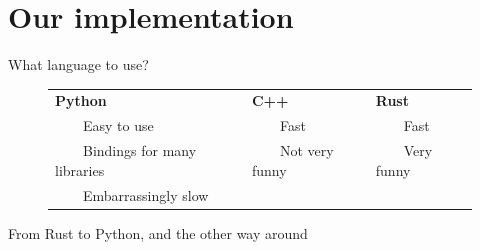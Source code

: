 \documentclass[aspectratio=169]{beamer}
\newcommand{\tabitem}{~~\llap{\textbullet}~~}
\theoremstyle{definition}
\begin{document}
\section{Our implementation}
\begin{frame}{What language to use?}
    \begin{figure}
        \centering
        \renewcommand{\arraystretch}{1.4}
        \begin{tabular}{p{5cm}p{4cm}p{4cm}}
            \centering\textbf{Python}&\centering\textbf{C++}&\hspace{1.3cm}\textbf{Rust}\\
            \tabitem Easy to use&\tabitem Fast&\tabitem Fast\\
            \tabitem Bindings for many libraries&\tabitem Not very funny&\tabitem Very funny\\
            \tabitem Embarrassingly slow&&
        \end{tabular}
    \end{figure}
\end{frame}

\begin{frame}{From Rust to Python, and the other way around}
    
\end{frame}
\end{document}
